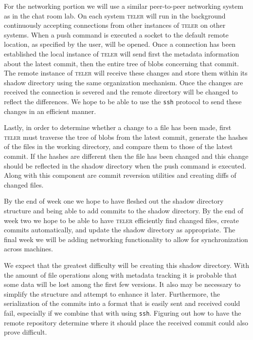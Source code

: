 \documentclass[12pt, letterpaper]{article}
\begin{document}
For the networking portion we will use a similar peer-to-peer
networking system as in the chat room lab. On each system
\textsc{teler} will run in the background continuously accepting
connections from other instances of \textsc{teler} on other systems.
When a push command is executed a socket to the default remote
location, as specified by the user, will be opened. Once a connection
has been established the local instance of \textsc{teler} will send
first the metadata information about the latest commit, then the
entire tree of blobs concerning that commit. The remote instance of
\textsc{teler} will receive these changes and store them within its
shadow directory using the same organization mechanism. Once the
changes are received the connection is severed and the remote
directory will be changed to reflect the differences. We hope to be
able to use the \texttt{ssh} protocol to send these changes in an
efficient manner.

Lastly, in order to determine whether a change to a file has been
made, first \textsc{teler} must
traverse the tree of blobs from the latest commit, generate the
hashes of the files in the working directory, and compare them to
those of the latest commit. If the hashes are different then the file
has been changed and this change should be reflected in the shadow
directory when the push command is executed. Along with this component
are commit reversion utilities and creating diffs of changed files.

By the end of week one we hope to have fleshed out the shadow
directory structure and being able to add commits to the shadow
directory. By the end of week two we hope to be able to have
\textsc{teler} efficiently find changed files, create commits
automatically, and update the shadow directory as appropriate. The
final week we will be adding networking functionality to allow for
synchronization across machines.

We expect that the greatest difficulty will be creating this shadow
directory. With the amount of file operations along with metadata
tracking it is probable that some data will be lost among the first
few versions. It also may be necessary to simplify the structure and
attempt to enhance it later. Furthermore, the serialization of the
commits into a format that is easily sent and received could fail,
especially if we combine that with using \texttt{ssh}. Figuring out
how to have the remote repository determine where it should place the
received commit could also prove difficult.
\end{document}
